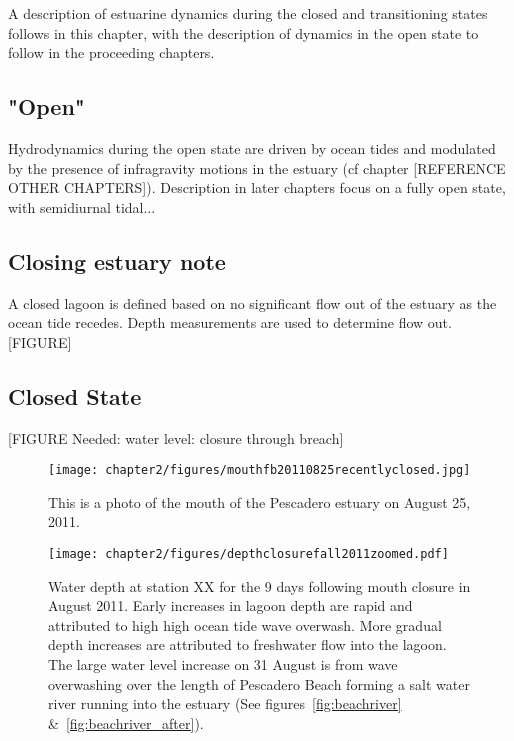 A description of estuarine dynamics during the closed and transitioning
states follows in this chapter, with the description of dynamics in the
open state to follow in the proceeding chapters.

\subsection{"Open"} \label{opench2}
Hydrodynamics during the open state are driven by ocean tides and modulated by the presence of infragravity motions in the 
estuary (cf chapter [REFERENCE OTHER CHAPTERS]). Description in later chapters focus on a fully open state, with 
semidiurnal tidal...


\subsection{Closing estuary note} \label{closingest} A closed lagoon is
defined based on no significant flow out of the estuary as the ocean
tide recedes. Depth measurements are used to determine flow out.
[FIGURE]

\subsection{Closed State} \label{closed dynamics}


[FIGURE Needed: water level: closure through breach]

\begin{figure}
\texttt{[image: chapter2/figures/mouthfb20110825recentlyclosed.jpg]} \caption{This is a photo of the
mouth of the Pescadero estuary on August 25, 2011.}
\label{fig:mouth_fb_20110825} \end{figure}

\begin{figure}
\texttt{[image: chapter2/figures/depthclosurefall2011zoomed.pdf]} \caption{Water depth at station XX for the 9 days following mouth closure in August 2011. Early increases in lagoon depth are rapid and attributed to high high ocean tide wave overwash. More gradual depth increases are attributed to freshwater flow into the lagoon. The large water level increase on 31 August is from wave overwashing over the length of Pescadero Beach forming a salt water river running into the estuary (See figures~\ref{fig:beachriver} \&~\ref{fig:beachriver_after}).}
\label{fig:depthclosuref11} \end{figure}


